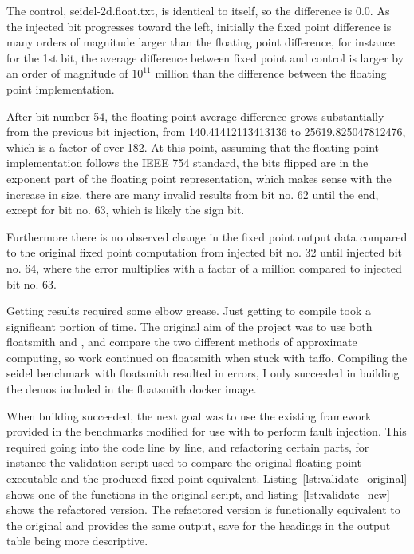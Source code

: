 The control, seidel-2d.float.txt, is identical to itself, so the difference is 0.0. As the injected bit progresses toward the left, initially the fixed point difference is many orders of magnitude larger than the floating point difference, for instance for the 1st bit, the average difference between fixed point and control is larger by an order of magnitude of $10^{11}$ million than the difference between the floating point implementation. 

After bit number 54, the floating point average difference grows substantially from the previous bit injection, from 140.41412113413136 to 25619.825047812476, which is a factor of over 182. At this point, assuming that the floating point implementation follows the IEEE 754 standard, the bits flipped are in the exponent part of the floating point representation, which makes sense with the increase in size. there are many invalid results from bit no. 62 until the end, except for bit no. 63, which is likely the sign bit.

Furthermore there is no observed change in the fixed point output data compared to the original fixed point computation from injected bit no. 32 until injected bit no. 64, where the error multiplies with a factor of a million compared to injected bit no. 63.


Getting results required some elbow grease. Just getting \taffo{} to compile took a significant portion of time. The original aim of the project was to use both floatsmith and \taffo, and compare the two different methods of approximate computing, so work continued on floatsmith when stuck with taffo. Compiling the seidel benchmark with floatsmith resulted in errors, I only succeeded in building the demos included in the floatsmith docker image. 

When building \taffo{}  succeeded, the next goal was to use the existing framework provided in the benchmarks modified for use with \taffo{}  to perform fault injection. This required going into the code line by line, and refactoring certain parts, for instance the validation script used to compare the original floating point executable and the \taffo{} produced fixed point equivalent. 
Listing~\ref{lst:validate_original} shows one of the functions in the original script, and listing~\ref{lst:validate_new} shows the refactored version. The refactored version is functionally equivalent to the original and provides the same output, save for the headings in the output table being more descriptive.





